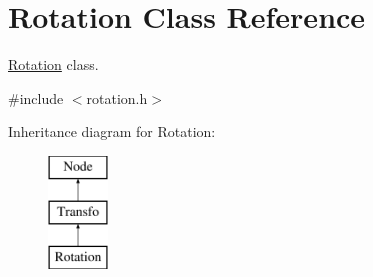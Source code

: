 \hypertarget{class_rotation}{
\section{\-Rotation \-Class \-Reference}
\label{class_rotation}
}


\hyperlink{class_rotation}{\-Rotation} class.  




{\ttfamily \#include $<$rotation.\-h$>$}

\-Inheritance diagram for \-Rotation\-:\begin{figure}[H]
\begin{center}
\leavevmode
\includegraphics[height=3.000000cm]{class_rotation}
\end{center}
\end{figure}
